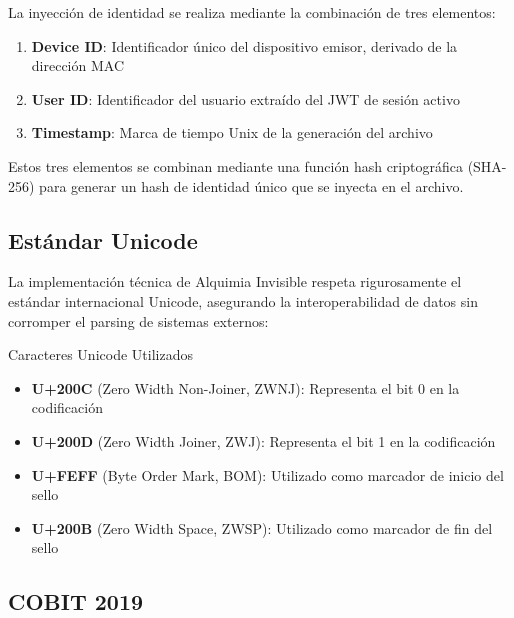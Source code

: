 La inyección de identidad se realiza mediante la combinación de tres elementos:

\begin{enumerate}
\item \textbf{Device ID}: Identificador único del dispositivo emisor, derivado de la dirección MAC
\item \textbf{User ID}: Identificador del usuario extraído del JWT de sesión activo
\item \textbf{Timestamp}: Marca de tiempo Unix de la generación del archivo
\end{enumerate}

Estos tres elementos se combinan mediante una función hash criptográfica (SHA-256) para generar un hash de identidad único que se inyecta en el archivo.

\subsection{Estándar Unicode}

La implementación técnica de Alquimia Invisible respeta rigurosamente el estándar internacional Unicode, asegurando la interoperabilidad de datos sin corromper el parsing de sistemas externos:

\begin{caja}{Caracteres Unicode Utilizados}
\begin{itemize}
\item \textbf{U+200C} (Zero Width Non-Joiner, ZWNJ): Representa el bit 0 en la codificación
\item \textbf{U+200D} (Zero Width Joiner, ZWJ): Representa el bit 1 en la codificación
\item \textbf{U+FEFF} (Byte Order Mark, BOM): Utilizado como marcador de inicio del sello
\item \textbf{U+200B} (Zero Width Space, ZWSP): Utilizado como marcador de fin del sello
\end{itemize}
\end{caja}


\subsection{COBIT 2019}

